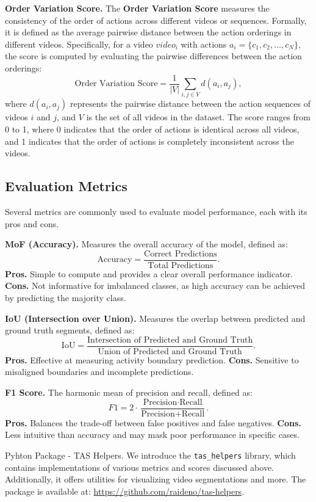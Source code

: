 \noindent\textbf{Order Variation Score.}  
The \textbf{Order Variation Score} measures the consistency of the order of actions across different videos or sequences. Formally, it is defined as the average pairwise distance between the action orderings in different videos. Specifically, for a video $video_i$ with actions $a_i = \{c_1, c_2, \dots, c_N\}$, the score is computed by evaluating the pairwise differences between the action orderings:
$$
\text{Order Variation Score} = \frac{1}{|V|} \sum_{i,j \in V} d(a_i, a_j),
$$
where $d(a_i, a_j)$ represents the pairwise distance between the action sequences of videos $i$ and $j$, and $V$ is the set of all videos in the dataset. The score ranges from 0 to 1, where 0 indicates that the order of actions is identical across all videos, and 1 indicates that the order of actions is completely inconsistent across the videos.

\subsection{Evaluation Metrics}

Several metrics are commonly used to evaluate model performance, each with its pros and cons. 

\noindent\textbf{MoF (Accuracy).} Measures the overall accuracy of the model, defined as:
$$
\text{Accuracy} = \frac{\text{Correct Predictions}}{\text{Total Predictions}}.
$$
\noindent\textbf{\small{Pros.}} Simple to compute and provides a clear overall performance indicator. \textbf{\small{Cons.}} Not informative for imbalanced classes, as high accuracy can be achieved by predicting the majority class.

\noindent\textbf{IoU (Intersection over Union).} Measures the overlap between predicted and ground truth segments, defined as:
$$
\text{IoU} = \frac{\text{Intersection of Predicted and Ground Truth}}{\text{Union of Predicted and Ground Truth}}.
$$
\noindent\textbf{\small{Pros.}} Effective at measuring activity boundary prediction. \textbf{\small{Cons.}} Sensitive to misaligned boundaries and incomplete predictions.

\noindent\textbf{F1 Score.} The harmonic mean of precision and recall, defined as:
$$
F1 = 2 \cdot \frac{\text{Precision} \cdot \text{Recall}}{\text{Precision} + \text{Recall}}.
$$
\noindent\textbf{\small{Pros.}} Balances the trade-off between false positives and false negatives. \textbf{\small{Cons.}} Less intuitive than accuracy and may mask poor performance in specific cases.

\begin{AIbox}{Pyhton Package - TAS Helpers.}
    We introduce the \texttt{tas\_helpers} library, which contains implementations of various metrics and scores discussed above. Additionally, it offers utilities for visualizing video segmentations and more. The package is available at: \url{https://github.com/raideno/tas-helpers}.
\end{AIbox}
